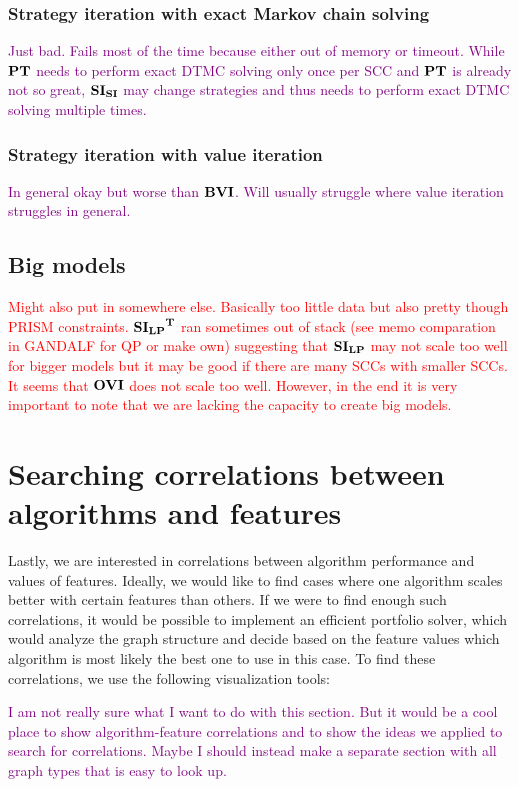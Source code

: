 \subsubsection*{Strategy iteration with exact Markov chain solving}
\textcolor{purple}{Just bad. Fails most of the time because either out of memory or timeout. 
While $\mathbf{PT}$ needs to perform exact DTMC solving only once per SCC and $\mathbf{PT}$ is already not so great, $\mathbf{SI_{SI}}$ may change strategies and thus needs to perform exact DTMC solving multiple times.
}

\subsubsection*{Strategy iteration with value iteration}
\textcolor{purple}{In general okay but worse than $\mathbf{BVI}$. Will usually struggle where value iteration struggles in general.}


\subsection{Big models}
\textcolor{red}{Might also put in somewhere else. Basically too little data but also pretty though PRISM constraints.
$\mathbf{\mathbf{SI_{LP}}^T}$ ran sometimes out of stack (see memo comparation in GANDALF for QP or make own) suggesting that $\mathbf{SI_{LP}}$ may not scale too well 
for bigger models but it may be good if there are many SCCs with smaller SCCs.
It seems that $\mathbf{OVI}$ does not scale too well. However, in the end it is very important to note that we are lacking the capacity to create
big models.}


\iffalse
\section{Searching correlations between algorithms and features}
Lastly, we are interested in correlations between algorithm performance and values of features.
Ideally, we would like to find cases where one algorithm scales better with certain features than others.
If we were to find enough such correlations, it would be possible to implement an efficient portfolio solver, which
would analyze the graph structure and decide based on the feature values which algorithm is most likely the best one to use in this case.
To find these correlations, we use the following visualization tools:

\textcolor{purple}{I am not really sure what I want to do with this section. 
But it would be a cool place to show algorithm-feature correlations and to show the ideas we applied to search for correlations.
Maybe I should instead make a separate section with all graph types that is easy to look up.}

